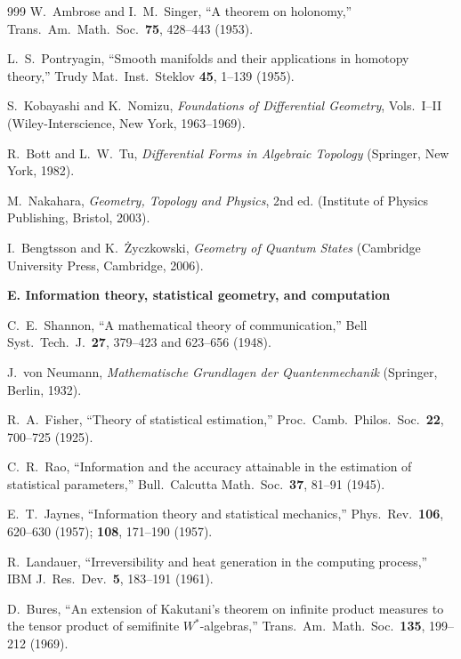 \begin{thebibliography}{999}
W.~Ambrose and I.~M.~Singer,
``A theorem on holonomy,''
Trans.\ Am.\ Math.\ Soc.\ \textbf{75}, 428--443 (1953).

L.~S.~Pontryagin,
``Smooth manifolds and their applications in homotopy theory,''
Trudy Mat.\ Inst.\ Steklov \textbf{45}, 1--139 (1955).

S.~Kobayashi and K.~Nomizu,
\emph{Foundations of Differential Geometry}, Vols.~I--II
(Wiley-Interscience, New York, 1963--1969).

R.~Bott and L.~W.~Tu,
\emph{Differential Forms in Algebraic Topology}
(Springer, New York, 1982).

M.~Nakahara,
\emph{Geometry, Topology and Physics}, 2nd ed.
(Institute of Physics Publishing, Bristol, 2003).

I.~Bengtsson and K.~\.{Z}yczkowski,
\emph{Geometry of Quantum States}
(Cambridge University Press, Cambridge, 2006).

\item[]\textbf{E. Information theory, statistical geometry, and computation}

C.~E.~Shannon,
``A mathematical theory of communication,''
Bell Syst.\ Tech.\ J.\ \textbf{27}, 379--423 and 623--656 (1948).

J.~von Neumann,
\emph{Mathematische Grundlagen der Quantenmechanik}
(Springer, Berlin, 1932).

R.~A.~Fisher,
``Theory of statistical estimation,''
Proc.\ Camb.\ Philos.\ Soc.\ \textbf{22}, 700--725 (1925).

C.~R.~Rao,
``Information and the accuracy attainable in the estimation of statistical
parameters,'' Bull.\ Calcutta Math.\ Soc.\ \textbf{37}, 81--91 (1945).

E.~T.~Jaynes,
``Information theory and statistical mechanics,''
Phys.\ Rev.\ \textbf{106}, 620--630 (1957); \textbf{108}, 171--190 (1957).

R.~Landauer,
``Irreversibility and heat generation in the computing process,''
IBM J.\ Res.\ Dev.\ \textbf{5}, 183--191 (1961).

D.~Bures,
``An extension of Kakutani's theorem on infinite product measures to the
tensor product of semifinite $W^*$-algebras,''
Trans.\ Am.\ Math.\ Soc.\ \textbf{135}, 199--212 (1969).


\end{thebibliography}
